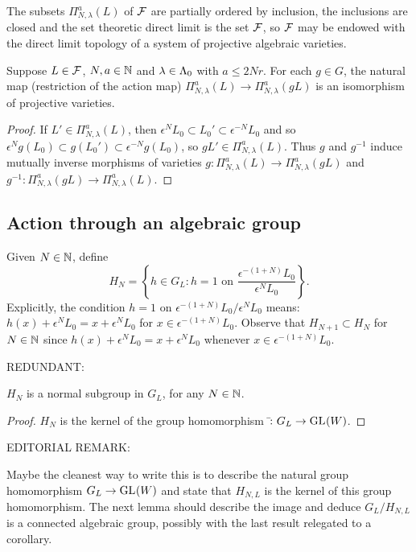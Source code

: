 \documentclass[a4paper, 11pt]{report}
\begin{document}
\begin{remark}{\color{blue}
The subsets $\Pi_{N,\lambda}^a(L)$ of $\mathcal{F}$ are partially ordered by inclusion, the inclusions are closed and the set theoretic direct limit is the set $\mathcal{F}$, so $\mathcal{F}$ may be endowed with the direct limit topology of a system of projective algebraic varieties.}
\end{remark}

\begin{lemma}
Suppose $L\in\mathcal{F}$, $N,a \in\mathbb{N}$ and $\lambda\in{\Lambda_0}$ with $a\le 2Nr$. For each $g\in G$, the natural map (restriction of the action map) $\Pi_{N,\lambda}^a(L)\to \Pi_{N,\lambda}^a(gL)$ is an isomorphism of projective varieties.
\end{lemma}

\begin{proof}
If $L'\in\Pi_{N,\lambda}^a(L)$, then $\epsilon^N L_0\subset L_0'\subset \epsilon^{-N}L_0$ and so $\epsilon^N g(L_0)\subset g(L_0')\subset \epsilon^{-N}g(L_0)$, so $gL'\in\Pi_{N,\lambda}^a(L)$. Thus $g$ and $g^{-1}$ induce mutually inverse morphisms of varieties $g\colon\Pi_{N,\lambda}^a(L)\to\Pi_{N,\lambda}^a(gL)$ and $g^{-1}\colon\Pi_{N,\lambda}^a(gL)\to\Pi_{N,\lambda}^a(L)$.
\end{proof}

\subsection{Action through an algebraic group}

Given $N\in\mathbb{N}$, define
\begin{equation*}
H_N = \left\{ h\in G_L: h=1 \text{ on } \frac{\epsilon^{-(1+N)}L_0}{\epsilon^N L_0} \right\}.
\end{equation*}
Explicitly, the condition $h=1$ on $\epsilon^{-(1+N)}L_0/{\epsilon^N L_0}$ means: $h(x) + \epsilon^N L_0 = x + \epsilon^N L_0$ for $x\in\epsilon^{-(1+N)}L_0$. Observe that $H_{N+1}\subset H_N$ for $N\in\mathbb{N}$ since $h(x) + \epsilon^N L_0 = x + \epsilon^N L_0$ whenever $x\in\epsilon^{-(1+N)}L_0$.

{\color{gray}
REDUNDANT:
\begin{lemma}
$H_N$ is a normal subgroup in $G_L$, for any $N\in\mathbb{N}$.
\end{lemma}

\begin{proof}
$H_N$ is the kernel of the group homomorphism $\bar{}\colon G_L\to\operatorname{GL}_{}(W)$.
\end{proof}

EDITORIAL REMARK:

Maybe the cleanest way to write this is to describe the natural group homomorphism $G_L\to \operatorname{GL}_{}(W)$ and state that $H_{N,L}$ is the kernel of this group homomorphism. The next lemma should describe the image and deduce $G_L/{H_{N,L}}$ is a connected algebraic group, possibly with the last result relegated to a corollary.
}
\end{document}
